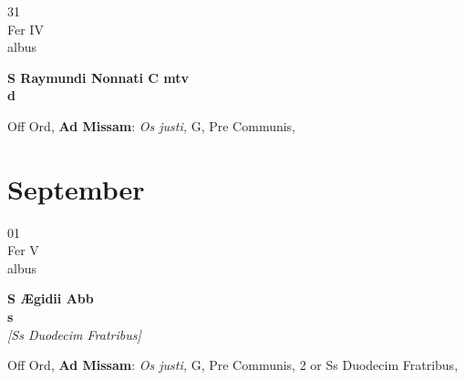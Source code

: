 \documentclass[10pt, openany]{book}
\begin{document}
        \begin{center}
            \begin{minipage}{3.5in}
                \vspace{2em}
                \begin{minipage}{0.5in}
                    {\Huge 31} \\
                    {\normalsize Fer IV} \\
                    {\normalsize albus}
                \end{minipage}
                \begin{minipage}{3.0in}
                    \textbf{ \large S Raymundi Nonnati C mtv \\
                    \textnormal{\normalsize d}} \\ 
                \end{minipage}
                \begin{justify}Off Ord, \textbf{Ad Missam}: \textit{Os justi,} G, Pre Communis,  
                \end{justify}
            \end{minipage}
        \end{center}
    
        \chapter{September}
                        
        \begin{center}
            \begin{minipage}{3.5in}
                \vspace{2em}
                \begin{minipage}{0.5in}
                    {\Huge 01} \\
                    {\normalsize Fer V} \\
                    {\normalsize albus}
                \end{minipage}
                \begin{minipage}{3.0in}
                    \textbf{ \large S Ægidii Abb \\
                    \textnormal{\normalsize s}} \\ \textit{[Ss Duodecim Fratribus]} \\ 
                \end{minipage}
                \begin{justify}Off Ord, \textbf{Ad Missam}: \textit{Os justi,} G, Pre Communis, 2 or Ss Duodecim Fratribus,  
                \end{justify}
            \end{minipage}
        \end{center}
    
\end{document}
